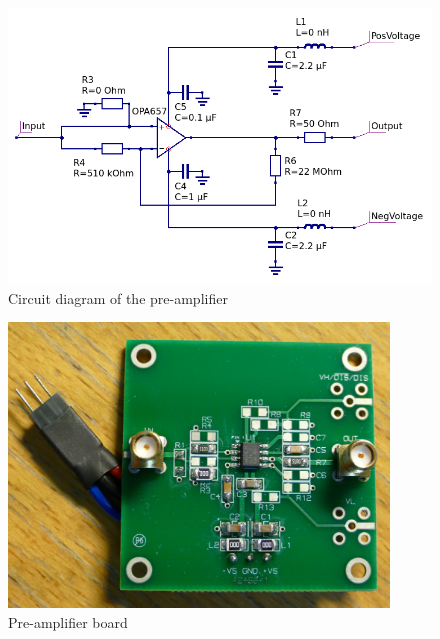 \documentclass[a4paper]{article}
\begin{document}
\begin{appendices}
\begin{figure}[ht!]
\centering
\includegraphics[width=\textwidth]{fig/amp-schematic/amplifier.png}
\caption{Circuit diagram of the pre-amplifier}
\label{fig:pre_amp_schematic}
\end{figure}

\begin{figure}[ht!]
\centering
\includegraphics[width=0.9\textwidth]{fig/P1170917-cropped.jpg}
\caption{Pre-amplifier board}
\label{fig:pre_amp_board}
\end{figure}


\end{appendices}
\end{document}
